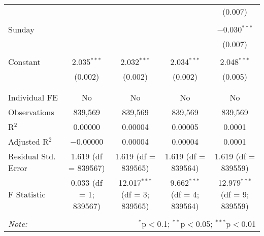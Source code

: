 \documentclass[
]{article}
\begin{document}
\begin{table}[!htbp]
{\begin{tabular}{@{\extracolsep{5pt}}lcccc}
  &  &  &  & (0.007) \\ 
  & & & & \\ 
 Sunday &  &  &  & $-$0.030$^{***}$ \\ 
  &  &  &  & (0.007) \\ 
  & & & & \\ 
 Constant & 2.035$^{***}$ & 2.032$^{***}$ & 2.034$^{***}$ & 2.048$^{***}$ \\ 
  & (0.002) & (0.002) & (0.002) & (0.005) \\ 
  & & & & \\ 
\hline \\[-1.8ex] 
Individual FE & No & No & No & No \\ 
Observations & 839,569 & 839,569 & 839,569 & 839,569 \\ 
R$^{2}$ & 0.00000 & 0.00004 & 0.00005 & 0.0001 \\ 
Adjusted R$^{2}$ & $-$0.00000 & 0.00004 & 0.00004 & 0.0001 \\ 
Residual Std. Error & 1.619 (df = 839567) & 1.619 (df = 839565) & 1.619 (df = 839564) & 1.619 (df = 839559) \\ 
F Statistic & 0.033 (df = 1; 839567) & 12.017$^{***}$ (df = 3; 839565) & 9.662$^{***}$ (df = 4; 839564) & 12.979$^{***}$ (df = 9; 839559) \\ 
\hline 
\hline \\[-1.8ex] 
\textit{Note:}  & \multicolumn{4}{r}{$^{*}$p$<$0.1; $^{**}$p$<$0.05; $^{***}$p$<$0.01} \\ 
\end{tabular}
} 
\end{table} 
\newpage
\end{document}
